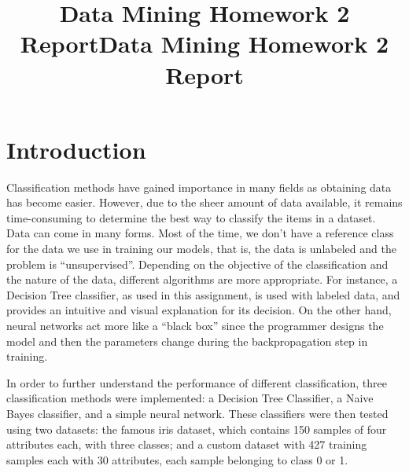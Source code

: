 \documentclass[
  paper=a4,
,captions=tableheading
]{scrartcl}
\title{Data Mining Homework 2 Report}
\date{}
\title{Data Mining Homework 2 Report}
\author{}
\begin{document}
\begin{titlepage}
\newcommand{\colorRule}[3][black]{\textcolor[HTML]{#1}{\rule{#2}{#3}}}
\end{titlepage}
\restoregeometry




\hypertarget{introduction}{%
\section{Introduction}\label{introduction}}

Classification methods have gained importance in many fields as
obtaining data has become easier. However, due to the sheer amount of
data available, it remains time-consuming to determine the best way to
classify the items in a dataset. Data can come in many forms. Most of
the time, we don't have a reference class for the data we use in
training our models, that is, the data is unlabeled and the problem is
``unsupervised''. Depending on the objective of the classification and
the nature of the data, different algorithms are more appropriate. For
instance, a Decision Tree classifier, as used in this assignment, is
used with labeled data, and provides an intuitive and visual explanation
for its decision. On the other hand, neural networks act more like a
``black box'' since the programmer designs the model and then the
parameters change during the backpropagation step in training.

In order to further understand the performance of different
classification, three classification methods were implemented: a
Decision Tree Classifier, a Naive Bayes classifier, and a simple neural
network. These classifiers were then tested using two datasets: the
famous iris dataset, which contains 150 samples of four attributes each,
with three classes; and a custom dataset with 427 training samples each
with 30 attributes, each sample belonging to class 0 or 1.
\end{document}
